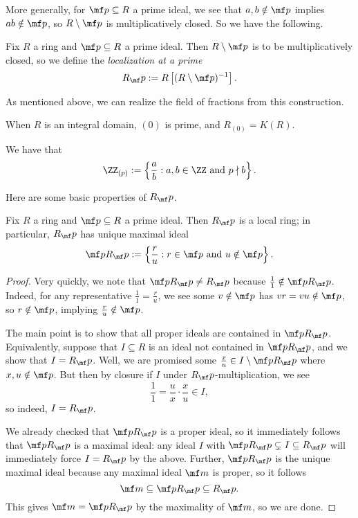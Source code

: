 More generally, for $\mf p\subseteq R$ a prime ideal, we see that $a,b\notin\mf p$ implies $ab\notin\mf p$, so $R\setminus\mf p$ is multiplicatively closed. So we have the following.
\begin{definition}
	Fix $R$ a ring and $\mf p\subseteq R$ a prime ideal. Then $R\setminus\mf p$ is to be multiplicatively closed, so we define the \textit{localization at a prime}
	\[R_\mf p:=R\left[(R\setminus\mf p)^{-1}\right].\]
\end{definition}
As mentioned above, we can realize the field of fractions from this construction.
\begin{example}
	When $R$ is an integral domain, $(0)$ is prime, and $R_{(0)}=K(R)$.
\end{example}
\begin{example}
	We have that
	\[\ZZ_{(p)}:=\left\{\frac ab:a,b\in\ZZ\text{ and }p\nmid b\right\}.\]
\end{example}
Here are some basic properties of $R_\mf p$.
\begin{proposition} \label{prop:localizetolocal}
	Fix $R$ a ring and $\mf p\subseteq R$ a prime ideal. Then $R_\mf p$ is a local ring; in particular, $R_\mf p$ has unique maximal ideal
	\[\mf pR_\mf p:=\left\{\frac ru:r\in\mf p\text{ and }u\notin\mf p\right\}.\]
\end{proposition}
\begin{proof}
	Very quickly, we note that $\mf pR_\mf p\ne R_\mf p$ because $\frac11\notin\mf pR_\mf p$. Indeed, for any representative $\frac11=\frac ru$, we see some $v\notin\mf p$ has $vr=vu\notin\mf p$, so $r\notin\mf p$, implying $\frac ru\notin\mf p$.
	
	The main point is to show that all proper ideals are contained in $\mf pR_\mf p$. Equivalently, suppose that $I\subseteq R$ is an ideal not contained in $\mf pR_\mf p$, and we show that $I=R_\mf p$. Well, we are promised some $\frac xu\in I\setminus\mf pR_\mf p$ where $x,u\notin\mf p$. But then by closure if $I$ under $R_\mf p$-multiplication, we see
	\[\frac11=\frac ux\cdot\frac xu\in I,\]
	so indeed, $I=R_\mf p$.

	We already checked that $\mf pR_\mf p$ is a proper ideal, so it immediately follows that $\mf pR_\mf p$ is a maximal ideal: any ideal $I$ with $\mf pR_\mf p\subsetneq I\subseteq R_\mf p$ will immediately force $I=R_\mf p$ by the above. Further, $\mf pR_\mf p$ is the unique maximal ideal because any maximal ideal $\mf m$ is proper, so it follows
	\[\mf m\subseteq\mf pR_\mf p\subseteq R_\mf p.\]
	This gives $\mf m=\mf pR_\mf p$ by the maximality of $\mf m$, so we are done.
\end{proof}
